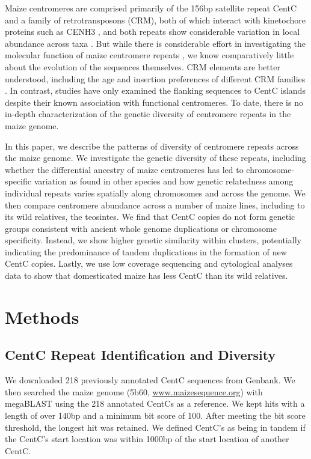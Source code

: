 Maize centromeres are comprised primarily of the 156bp satellite repeat CentC and a family of retrotransposons (CRM), both of which interact with  kinetochore proteins such as CENH3 \citep{Wolfgruber2009, Zhong2002}, and both repeats show considerable variation in local abundance across taxa \citep{Albert2010}.  But while there is considerable effort in investigating the molecular function of maize centromere repeats \citep{Ananiev1998B, Nagaki2003, Wolfgruber2009}, we know comparatively little about the evolution of the sequences themselves. CRM elements are better understood, including the age and insertion preferences of different CRM families \citep{Wolfgruber2009, Sharma2008}.  In contrast,  studies \citep{Wang2012} have only examined the flanking sequences to CentC islands despite their known association with functional centromeres.  To date, there is no in-depth characterization of the genetic diversity of centromere repeats in the maize genome.  

In this paper, we describe the patterns of diversity of centromere repeats across the maize genome.  We investigate the genetic diversity of these repeats, including whether the differential ancestry of maize centromeres \citep{Wang2012} has led to chromosome-specific variation as found in other species \citep{Kawabe2005, Pontes2004} and how genetic relatedness among individual repeats varies spatially along chromosomes and across the genome.  We then compare centromere abundance across a number of maize lines, including to its wild relatives, the teosintes.  We find that CentC copies do not form genetic groups consistent with ancient whole genome duplications or chromosome specificity.  Instead, we show higher genetic similarity within clusters, potentially indicating the predominance of tandem duplications in the formation of new CentC copies.  Lastly, we use low coverage sequencing and cytological analyses data to show that domesticated maize has less CentC than its wild relatives.

\section*{Methods} 
\label{methods}

\subsection*{CentC Repeat Identification and Diversity}

We downloaded 218 previously annotated CentC sequences \citep{Ananiev1998B, Nagaki2003} from Genbank.  We then searched the maize genome (5b60, \url{www.maizesequence.org}) with megaBLAST \citep{McGinnis2004} using the 218 annotated CentCs as a reference.  We kept hits with a length of over 140bp and a minimum bit score of 100.  After meeting the bit score threshold, the longest hit was retained.  We defined CentC’s as being in tandem if the CentC’s start location was within 1000bp of the start location of another CentC.
	
